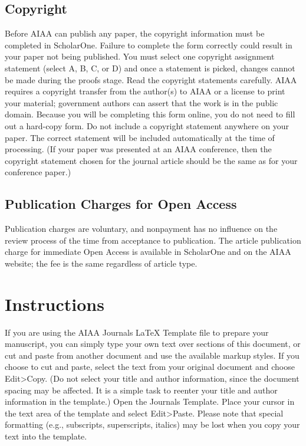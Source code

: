 \documentclass[journal ]{new-aiaa}
\begin{document}
\subsection{Copyright}

Before AIAA can publish any paper, the copyright information must be completed in ScholarOne. Failure to complete the form correctly could result in your paper not being published. You must select one copyright assignment statement (select A, B, C, or D) and once a statement is picked, changes cannot be made during the proofs stage. Read the copyright statements carefully. AIAA requires a copyright transfer from the author(s) to AIAA or a license to print your material; government authors can assert that the work is in the public domain. Because you will be completing this form online, you do not need to fill out a hard-copy form. Do not include a copyright statement anywhere on your paper. The correct statement will be included automatically at the time of processing. (If your paper was presented at an AIAA conference, then the copyright statement chosen for the journal article should be the same as for your conference paper.)

\subsection{Publication Charges for Open Access}

Publication charges are voluntary, and nonpayment has no influence on the review process of the time from acceptance to publication. The article publication charge for immediate Open Access is available in ScholarOne and on the AIAA website; the fee is the same regardless of article type.


\section{Instructions}

If you are using the AIAA Journals \LaTeX{} Template file to prepare your manuscript, you can simply type your own text over sections of this document, or cut and paste from another document and use the available markup styles. If you choose to cut and paste, select the text from your original document and choose Edit>Copy. (Do not select your title and author information, since the document spacing may be affected. It is a simple task to reenter your title and author information in the template.) Open the Journals Template. Place your cursor in the text area of the template and select Edit>Paste. Please note that special formatting (e.g., subscripts, superscripts, italics) may be lost when you copy your text into the template.
\end{document}
